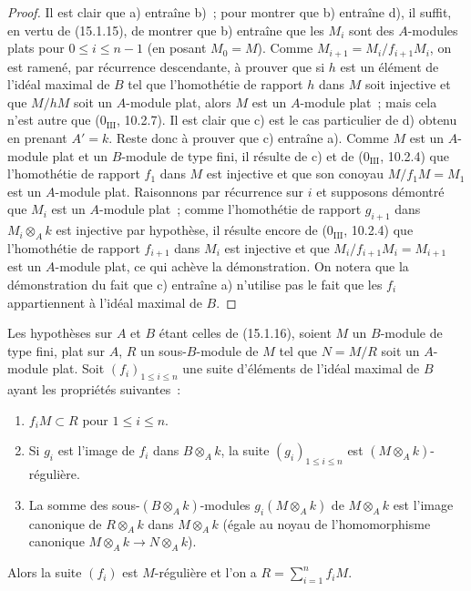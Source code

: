 \begin{proof}
Il est clair que a) entraîne b)~; pour montrer que b) entraîne d), il suffit,
en vertu de (15.1.15), de montrer que b) entraîne que les $M_i$ sont des
$A$-modules plats pour $0\leq i\leq n-1$ (en posant $M_0=M$). Comme
$M_{i+1}=M_i/f_{i+1}M_i$, on est ramené, par récurrence descendante, à prouver
que si $h$ est un élément de l'idéal maximal de $B$ tel que l'homothétie de
rapport $h$ dans $M$ soit injective et que $M/hM$ soit un $A$-module plat,
alors $M$ est un $A$-module plat~; mais cela n'est autre que
($0_{\mathrm{III}}$, 10.2.7). Il est clair que c) est le cas particulier de
d) obtenu en prenant $A'=k$. Reste donc à prouver que c) entraîne a). Comme
$M$ est un $A$-module plat et un $B$-module de type fini, il résulte de c) et
de ($0_{\mathrm{III}}$, 10.2.4) que l'homothétie de rapport $f_1$ dans $M$
est injective et que son conoyau $M/f_1M=M_1$ est un $A$-module plat.
Raisonnons par récurrence sur $i$ et supposons démontré que $M_i$ est un
$A$-module plat~; comme l'homothétie de rapport $g_{i+1}$ dans
$M_i\otimes_A k$ est injective par hypothèse, il résulte encore de
($0_{\mathrm{III}}$, 10.2.4) que l'homothétie de rapport $f_{i+1}$ dans
$M_i$ est injective et que $M_i/f_{i+1}M_i=M_{i+1}$ est un $A$-module plat,
ce qui achève la démonstration. On notera que la démonstration du fait que c)
entraîne a) n'utilise pas le fait que les $f_i$ appartiennent à l'idéal
maximal de $B$.
\end{proof}

\begin{corollary}[15.1.17]
\label{0.15.1.17-fr}
Les hypothèses sur $A$ et $B$ étant celles de (15.1.16), soient $M$ un
$B$-module de type fini, plat sur $A$, $R$ un sous-$B$-module de $M$ tel que
$N=M/R$ soit un $A$-module plat. Soit $(f_i)_{1\leq i\leq n}$ une suite
d'éléments de l'idéal maximal de $B$ ayant les propriétés suivantes~:
\begin{enumerate}
  \item[(i)] $f_iM\subset R$ pour $1\leq i\leq n$.
  \item[(ii)] Si $g_i$ est l'image de $f_i$ dans $B\otimes_A k$, la suite
  $(g_i)_{1\leq i\leq n}$ est $(M\otimes_A k)$-régulière.
  \item[(iii)] La somme des sous-$(B\otimes_A k)$-modules
  $g_i(M\otimes_A k)$ de $M\otimes_A k$ est l'image canonique de
  $R\otimes_A k$ dans $M\otimes_A k$ (égale au noyau de l'homomorphisme
  canonique $M\otimes_A k\to N\otimes_A k$).
\end{enumerate}
Alors la suite $(f_i)$ est $M$-régulière et l'on a
$R=\sum_{i=1}^n f_iM$.
\end{corollary}


